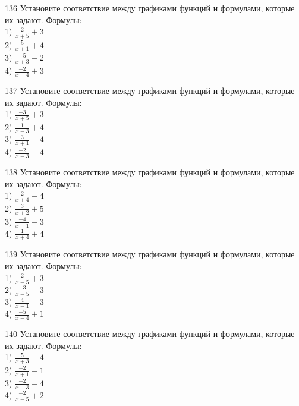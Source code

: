 \documentclass[4apaper]{article}
\begin{document}
\begin{taskBN}{136}
Установите соответствие между графиками функций и формулами, которые их задают. Формулы: \\1) $\frac{2}{x+5}+3$\\2) $\frac{5}{x+1}+4$\\3) $\frac{-5}{x+3}-2$\\4) $\frac{-2}{x-4}+3$
\end{taskBN}

\begin{taskBN}{137}
Установите соответствие между графиками функций и формулами, которые их задают. Формулы: \\1) $\frac{-3}{x+5}+3$\\2) $\frac{1}{x-3}+4$\\3) $\frac{3}{x+1}-4$\\4) $\frac{-2}{x-3}-4$
\end{taskBN}

\begin{taskBN}{138}
Установите соответствие между графиками функций и формулами, которые их задают. Формулы: \\1) $\frac{2}{x+4}-4$\\2) $\frac{3}{x+2}+5$\\3) $\frac{-4}{x-1}-3$\\4) $\frac{1}{x+4}+4$
\end{taskBN}

\begin{taskBN}{139}
Установите соответствие между графиками функций и формулами, которые их задают. Формулы: \\1) $\frac{2}{x-5}+3$\\2) $\frac{-3}{x-5}-3$\\3) $\frac{4}{x-1}-3$\\4) $\frac{-5}{x-4}+1$
\end{taskBN}

\begin{taskBN}{140}
Установите соответствие между графиками функций и формулами, которые их задают. Формулы: \\1) $\frac{5}{x+3}-4$\\2) $\frac{-2}{x+1}-1$\\3) $\frac{-2}{x-3}-4$\\4) $\frac{-2}{x-5}+2$
\end{taskBN}
\end{document}
